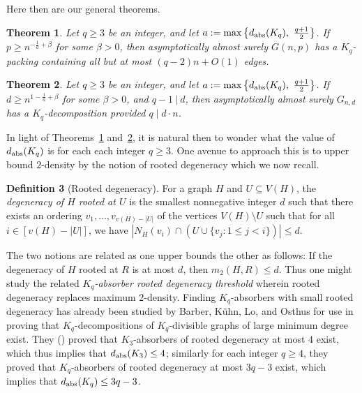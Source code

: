 \documentclass[11pt]{article}
\numberwithin{equation}{section}
\newcounter{i}
\theoremstyle{plain}
\newtheorem{thm}{Theorem}[section]
\theoremstyle{plain} %
\theoremstyle{definition}
\newtheorem{definition}[thm]{Definition}
\begin{document}
Here then are our general theorems.

\begin{thm}\label{thm:YusterRandomGeneral}
Let $q \ge 3$ be an integer, and let $a:= \max\left\{ d_{{\rm abs}}(K_q),~ \frac{q+1}{2}\right\}$. If $p\ge n^{-\frac{1}{a}+\beta}$ for some $\beta > 0$, then asymptotically almost surely $G(n,p)$ has a $K_q$-packing containing all but at most $(q-2)n+O(1)$ edges.%
\end{thm}

\begin{thm}\label{thm:YusterRandomRegularGeneral}
Let $q \ge 3$ be an integer, and let $a:= \max\left\{ d_{{\rm abs}}(K_q),~ \frac{q+1}{2}\right\}$. If $d\ge n^{1-\frac{1}{a}+\beta}$ for some $\beta > 0$, and $q-1~|~d$, then asymptotically almost surely $G_{n,d}$ has a $K_q$-decomposition provided $q \mid d \cdot n$. 
\end{thm}

In light of Theorems~\ref{thm:YusterRandomGeneral} and~\ref{thm:YusterRandomRegularGeneral}, it is natural then to wonder what the value of $d_{\rm abs}(K_q)$ is for each each integer $q\ge 3$. One avenue to approach this is to upper bound $2$-density by the notion of rooted degeneracy which we now recall. 

\begin{definition}[Rooted degeneracy]
For a graph $H$ and $U\subseteq V(H)$, the \emph{degeneracy of $H$ rooted at $U$} is the smallest nonnegative integer $d$ such that there exists an ordering $v_1,\ldots, v_{v(H)-|U|}$ of the vertices $V(H)\setminus U$ such that for all $i\in [v(H)-|U|]$, we have $|N_H(v_i)\cap (U\cup \{v_j: 1\le j < i\})| \le d$.  
\end{definition}

The two notions are related as one upper bounds the other as follows: If the degeneracy of $H$ rooted at $R$ is at most $d$, then $m_2(H,R)\le d$. Thus one might study the related \emph{$K_q$-absorber rooted degeneracy threshold} wherein rooted degeneracy replaces maximum $2$-density. Finding $K_q$-absorbers with small rooted degeneracy has already been studied by Barber, K\"uhn, Lo, and Osthus \cite{BKLO16} for use in proving that $K_q$-decompositions of $K_q$-divisible graphs of large minimum degree exist. They (\cite[Corollary 8.10, Lemma 8.11, Lemma 12.3]{BKLO16}) proved that $K_3$-absorbers of rooted degeneracy at most $4$ exist, which thus implies that $d_{\rm abs}(K_3)\le 4$; similarly for each integer $q\ge 4$, they proved that $K_q$-absorbers of rooted degeneracy at most $3q-3$ exist, which implies that $d_{\rm abs}(K_q)\le 3q-3$. 
\end{document}
